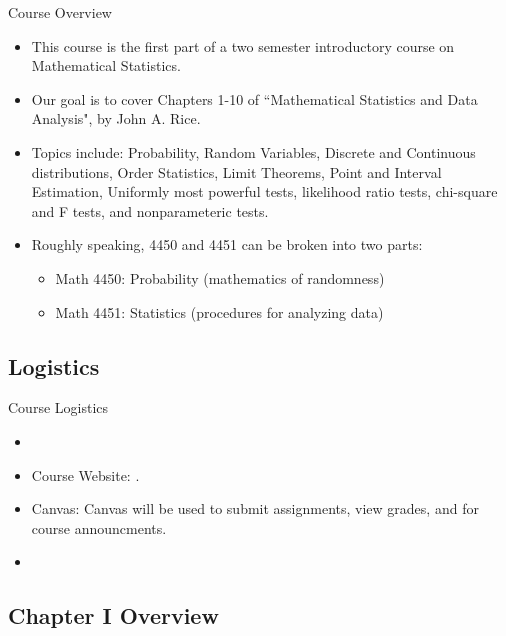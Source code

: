\begin{frame}{Course Overview}
  \begin{itemize}
  \item This course is the first part of a two semester introductory course on Mathematical Statistics.
  \item Our goal is to cover Chapters 1-10 of ``Mathematical Statistics and Data Analysis", by John A. Rice.
  \item Topics include: Probability, Random Variables, Discrete and Continuous distributions, Order Statistics, Limit Theorems, Point and Interval Estimation, Uniformly most powerful tests, likelihood ratio tests, chi-square and F tests, and nonparameteric tests.
  \item Roughly speaking, 4450 and 4451 can be broken into two parts: 
  \begin{itemize}
    \item Math 4450: Probability (mathematics of randomness)
    \item Math 4451: Statistics (procedures for analyzing data)
  \end{itemize}
  \end{itemize}
\end{frame}

\subsection{Logistics}

\begin{frame}{Course Logistics}
  \begin{itemize}
    \item {}
    \item Course Website: . 
    \item Canvas: Canvas will be used to submit assignments, view grades, and for course announcments.
    \item {}
  \end{itemize}
\end{frame}

\subsection{Chapter I Overview}


